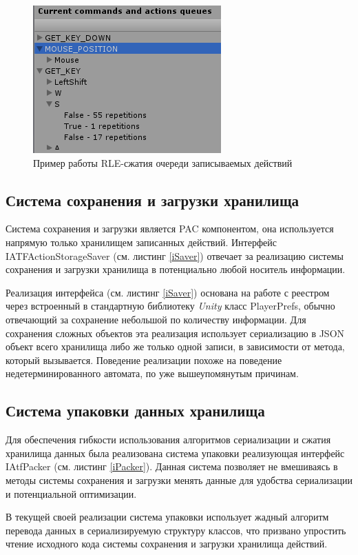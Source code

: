\begin{figure}[h]
	\centering
	\includegraphics[width=0.5\linewidth]{storageContains.png}
	\caption{Пример работы RLE-сжатия очереди записываемых действий}
	\label{storageContains}
\end{figure}

\subsection{Система сохранения и загрузки хранилища}
Система сохранения и загрузки является PAC компонентом, она используется напрямую только хранилищем записанных действий. Интерфейс IATFActionStorageSaver (см. листинг \ref{iSaver}) отвечает за реализацию системы сохранения и загрузки хранилища в потенциально любой носитель информации.

Реализация интерфейса (см. листинг \ref{iSaver}) основана на работе с реестром через встроенный в стандартную библиотеку \textit{Unity} класс PlayerPrefs, обычно отвечающий за сохранение небольшой по количеству информации. Для сохранения сложных объектов эта реализация использует сериализацию в JSON объект всего хранилища либо же только одной записи, в зависимости от метода, который вызывается. Поведение реализации похоже на поведение недетерминированного автомата, по уже вышеупомянутым причинам.

\subsection{Система упаковки данных хранилища}
Для обеспечения гибкости использования алгоритмов сериализации и сжатия хранилища данных была реализована система упаковки реализующая интерфейс IAtfPacker (см. листинг \ref{iPacker}). Данная система позволяет не вмешиваясь в методы системы сохранения и загрузки менять данные для удобства сериализации и потенциальной оптимизации.

В текущей своей реализации система упаковки использует жадный алгоритм перевода данных в сериализируемую структуру классов, что призвано упростить чтение исходного кода системы сохранения и загрузки хранилища действий.

